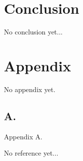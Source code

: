 \documentclass[conference,compsoc]{report}
\begin{document}

\section{Conclusion}
No conclusion yet...


\section{Appendix}
No appendix yet.

\subsection{A.}
Appendix A.



\begin{thebibliography}{1}

  
 
No reference yet...

\end{thebibliography}
\end{document}
